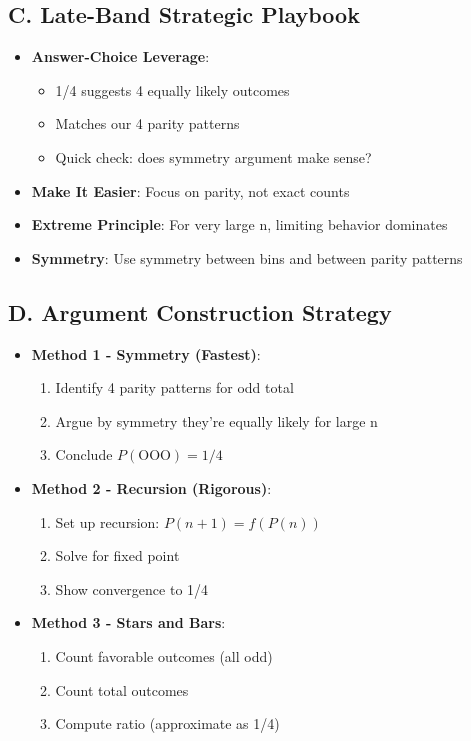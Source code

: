 \documentclass[12pt]{article}
\begin{document}
\begin{strategicbox}
\subsection*{C. Late-Band Strategic Playbook}
\begin{itemize}[leftmargin=*]
    \item \textbf{Answer-Choice Leverage}: 
    \begin{itemize}
        \item 1/4 suggests 4 equally likely outcomes
        \item Matches our 4 parity patterns
        \item Quick check: does symmetry argument make sense?
    \end{itemize}
    \item \textbf{Make It Easier}: Focus on parity, not exact counts
    \item \textbf{Extreme Principle}: For very large n, limiting behavior dominates
    \item \textbf{Symmetry}: Use symmetry between bins and between parity patterns
\end{itemize}

\subsection*{D. Argument Construction Strategy}
\begin{itemize}[leftmargin=*]
    \item \textbf{Method 1 - Symmetry (Fastest)}: 
    \begin{enumerate}
        \item Identify 4 parity patterns for odd total
        \item Argue by symmetry they're equally likely for large n
        \item Conclude $P(\text{OOO}) = 1/4$
    \end{enumerate}
    \item \textbf{Method 2 - Recursion (Rigorous)}: 
    \begin{enumerate}
        \item Set up recursion: $P(n+1) = f(P(n))$
        \item Solve for fixed point
        \item Show convergence to 1/4
    \end{enumerate}
    \item \textbf{Method 3 - Stars and Bars}: 
    \begin{enumerate}
        \item Count favorable outcomes (all odd)
        \item Count total outcomes
        \item Compute ratio (approximate as 1/4)
    \end{enumerate}
\end{itemize}


\end{strategicbox}
\end{document}
